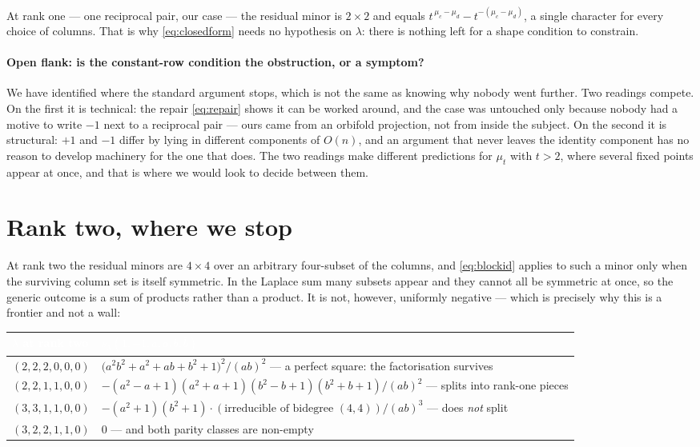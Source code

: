 \documentclass[11pt,a4paper]{article}
\begin{document}
At rank one --- one reciprocal pair, our case --- the residual minor is $2\times2$ and equals
$t^{\,\mu_c-\mu_d}-t^{-(\mu_c-\mu_d)}$, a single character for every choice of columns. That is
why \eqref{eq:closedform} needs no hypothesis on $\lambda$: there is nothing left for a shape
condition to constrain.

\paragraph{Open flank: is the constant-row condition the obstruction, or a symptom?} We have
identified where the standard argument stops, which is not the same as knowing why nobody went
further. Two readings compete. On the first it is technical: the repair \eqref{eq:repair} shows
it can be worked around, and the case was untouched only because nobody had a motive to write
$-1$ next to a reciprocal pair --- ours came from an orbifold projection, not from inside the
subject. On the second it is structural: $+1$ and $-1$ differ by lying in different components
of $O(n)$, and an argument that never leaves the identity component has no reason to develop
machinery for the one that does. The two readings make different predictions for $\mu_t$ with
$t>2$, where several fixed points appear at once, and that is where we would look to decide
between them.

\section{Rank two, where we stop}\label{sec:ranktwo}

At rank two the residual minors are $4\times4$ over an arbitrary four-subset of the columns,
and \eqref{eq:blockid} applies to such a minor only when the surviving column set is itself
symmetric. In the Laplace sum many subsets appear and they cannot all be symmetric at once, so
the generic outcome is a sum of products rather than a product. It is not, however, uniformly
negative --- which is precisely why this is a frontier and not a wall:

\begin{center}\small
\begin{tabular}{lp{9.4cm}}
\toprule
\rowcolor{hdrblue}
\textcolor{white}{$\lambda$ at rank two} & \textcolor{white}{$s_\lambda(1,-1,a,\bar a,b,\bar b)$}\\
\midrule
$(2,2,2,0,0,0)$ & $\big(a^2b^2+a^2+ab+b^2+1\big)^2/(ab)^2$ --- a perfect square: the
factorisation survives\\
\rowcolor{softgrey}
$(2,2,1,1,0,0)$ & $-(a^2{-}a{+}1)(a^2{+}a{+}1)(b^2{-}b{+}1)(b^2{+}b{+}1)/(ab)^2$ --- splits into
rank-one pieces\\
$(3,3,1,1,0,0)$ & $-(a^2{+}1)(b^2{+}1)\cdot(\text{irreducible of bidegree }(4,4))/(ab)^3$ --- does
\emph{not} split\\
\rowcolor{softgrey}
$(3,2,2,1,1,0)$ & $0$ --- and both parity classes are non-empty\\
\bottomrule
\end{tabular}
\end{center}
\end{document}
